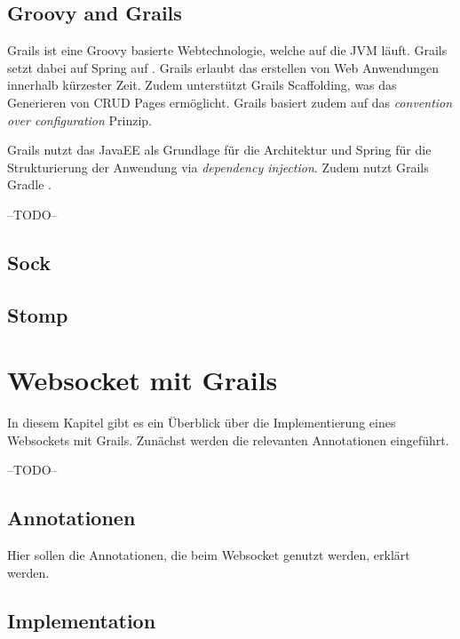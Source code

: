 \subsection{Groovy and Grails}

Grails ist eine Groovy basierte Webtechnologie, welche auf die \ac{JVM} läuft. Grails setzt dabei auf Spring auf \cite{grails2017}. Grails erlaubt das erstellen von Web Anwendungen innerhalb kürzester Zeit. Zudem unterstützt Grails Scaffolding, was das Generieren von CRUD Pages ermöglicht. Grails basiert zudem auf das \textit{convention over configuration} Prinzip. 

Grails nutzt das JavaEE als Grundlage für die Architektur und Spring für die Strukturierung der Anwendung via \textit{dependency injection}. Zudem nutzt Grails Gradle \cite{grailsVogella2017}.

--TODO--

\subsection{Sock}


\subsection{Stomp}


\section{Websocket mit Grails}

In diesem Kapitel gibt es ein Überblick über die Implementierung eines Websockets mit Grails. Zunächst werden die relevanten Annotationen eingeführt.  

--TODO--

\subsection{Annotationen}

Hier sollen die Annotationen, die beim Websocket genutzt werden, erklärt werden.

\subsection{Implementation}
